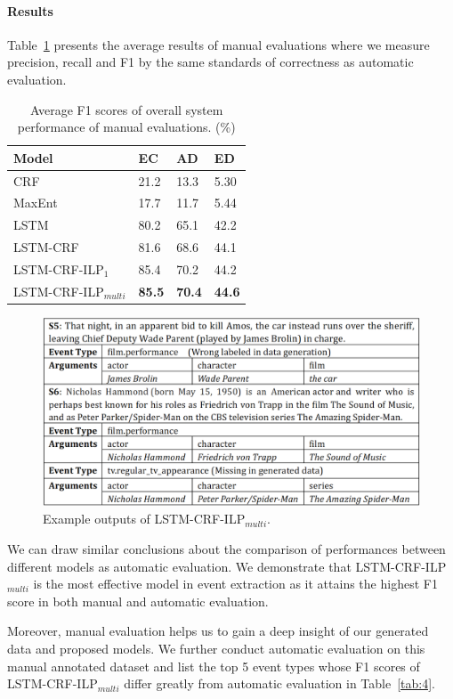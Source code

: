 \documentclass{article}
\begin{document}
\paragraph{Results}
Table~\ref{tab:2} presents the average results of manual evaluations where we measure precision, recall and F1 by the same standards of correctness as automatic evaluation.  

\begin{table}[t]
\small
\centering
\begin{tabular}{|l|p{0.8cm}<{\centering}|p{0.8cm}<{\centering}|p{0.8cm}<{\centering}|} \hline
	Model & EC & AD & ED \\ \hline
	CRF & 21.2 & 13.3 & 5.30 \\ \hline
	MaxEnt & 17.7 & 11.7 & 5.44 \\ \hline
	LSTM & 80.2 & 65.1 & 42.2 \\ \hline \hline
	LSTM-CRF & 81.6 & 68.6 & 44.1 \\ \hline
	LSTM-CRF-ILP$_{1}$ & 85.4 & 70.2 & 44.2 \\ \hline
	LSTM-CRF-ILP$_{multi}$ & \textbf{85.5} & \textbf{70.4} & \textbf{44.6} \\ \hline
\end{tabular}
\caption{Average F1 scores of overall system performance of manual evaluations. (\%) \label{tab:2}}
\end{table}

\begin{figure}[h]
	\centering
	\includegraphics[width=.48\textwidth]{example.png}
	\caption{Example outputs of LSTM-CRF-ILP$_{multi}$.\label{fig:1}}
\end{figure}

We can draw similar conclusions about the comparison of performances between different models as automatic evaluation. We demonstrate that LSTM-CRF-ILP$_{multi}$ is the most effective model in event extraction as it attains the highest F1 score in both manual and automatic evaluation.

Moreover, manual evaluation helps us to gain a deep insight of our generated data and proposed models. We further conduct automatic evaluation on this manual annotated dataset and list the top 5 event types whose F1 scores of LSTM-CRF-ILP$_{multi}$ differ greatly from automatic evaluation in Table~\ref{tab:4}. 
\end{document}
